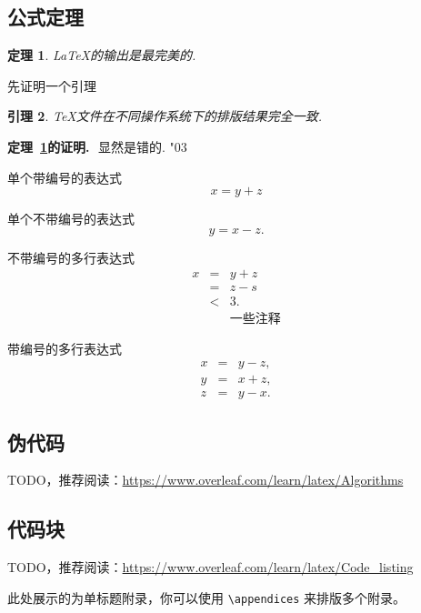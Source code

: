 \documentclass{nktba}
\newtheorem{Theorem}{\hspace{2em}定理}[section]
\newtheorem{Lemma}[Theorem]{\hspace{2em}引理}
\newenvironment{proof}[1][证明]{\par\textbf{#1.}\,\, }{\hfill{\usefont{U}{msa}{m}{n}\char"03}}
\begin{document}
\subsection{公式定理}

\begin{Theorem} \label{thm:latex}
\LaTeX 的输出是最完美的.
\end{Theorem}

先证明一个引理
\begin{Lemma} \label{thm:tex}
\TeX 文件在不同操作系统下的排版结果完全一致.
\end{Lemma}

\begin{proof}[定理~\ref{thm:latex}的证明]
显然是错的.
\end{proof}

单个带编号的表达式
\begin{equation}\label{eq:a1}
x=y+z
\end{equation}

单个不带编号的表达式
\[
y=x-z.
\]

不带编号的多行表达式
\begin{eqnarray*}
x&=&y+z \\
  &=&z-s\\
  &<& 3. \\
  && \mbox{一些注释}
\end{eqnarray*}

带编号的多行表达式
\begin{eqnarray}
  x&=& y-z, \label{eq:aa1}\\
  y&=& x+z, \nonumber \\
  z&=&y-x. \label{eq:aa2}
\end{eqnarray}

\subsection{伪代码}

TODO，推荐阅读：\url{https://www.overleaf.com/learn/latex/Algorithms}

\subsection{代码块}

TODO，推荐阅读：\url{https://www.overleaf.com/learn/latex/Code_listing}

\appendix
此处展示的为单标题附录，你可以使用 \verb|\appendices| 来排版多个附录。

\begin{reference}
\printbibliography[heading=none]
\end{reference}
\end{document}
